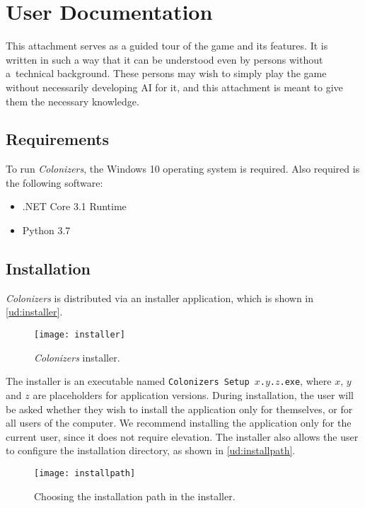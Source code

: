 \section{User Documentation}
\label{sec:userdocs}

This attachment serves as a guided tour of the game and its features.
It is written in such a way that it can be understood even by persons
without a~technical background. These persons may wish to simply
play the game without necessarily developing AI for it, and this attachment
is meant to give them the necessary knowledge.

\subsection{Requirements}

To run \emph{Colonizers}, the Windows 10 operating system is required.
Also required is the following software:
\begin{itemize}
    \item .NET Core 3.1 Runtime
    \item Python 3.7
\end{itemize}

\subsection{Installation}

\emph{Colonizers} is distributed via an installer application, which is shown
in \autoref{ud:installer}.

\begin{figure}[ht]
\centerline{\mbox{\texttt{[image: installer]}}}
\caption{\emph{Colonizers} installer.}\label{ud:installer}
\end{figure}

The installer is an executable named \texttt{Colonizers Setup $x$.$y$.$z$.exe},
where $x$, $y$ and $z$ are placeholders for application versions. During installation,
the user will be asked whether they wish to install the application only for themselves,
or for all users of the computer. We recommend installing the application
only for the current user, since it does not require elevation. The installer
also allows the user to configure the installation directory,
as shown in \autoref{ud:installpath}.

\begin{figure}[ht]
\centerline{\mbox{\texttt{[image: installpath]}}}
\caption{Choosing the installation path in the installer.}\label{ud:installpath}
\end{figure}

